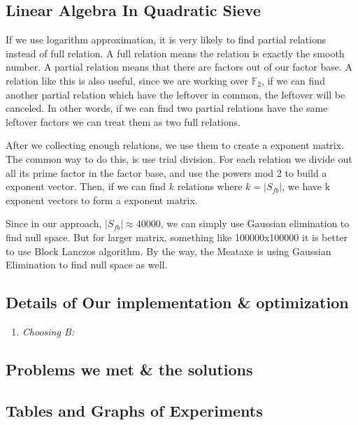 \documentclass[12pt]{article} %
\begin{document}
\subsection {Linear Algebra In Quadratic Sieve}

If we use logarithm approximation, it is very likely to find partial relations instead of full relation. A full relation means the relation is exactly the smooth number. A partial relation means that there are factors out of our factor base. A relation like this is also useful, since we are working over $\mathbb{F}_2$, if we can find another partial relation which have the leftover in common, the leftover will be canceled. In other words, if we can find two partial relations have the same leftover factors we can treat them as two full relations.

After we collecting enough relations, we use them to create a exponent matrix. The common way to do this, is use trial division. For each relation we divide out all its  prime factor in the factor base, and use the powers mod 2 to build a exponent vector. 
Then, if we can find $k$ relations where $k = |S_{fb}|$, we have k exponent vectors to form a exponent matrix. 

Since in our approach, $|S_{fb}|\approx 40000$, we can simply use Gaussian elimination to find null space. But for larger matrix, something like 100000x100000 it is better to use Block Lanczos algorithm. By the way, the Meataxe is using Gaussian Elimination to find null space as well.

\subsection {Details of Our implementation \& optimization}

\renewcommand\labelenumi{\Roman{enumi}}
\begin{enumerate}
\item \textit{Choosing B:} 
\end{enumerate}

\subsection {Problems we met \& the solutions}

\subsection {Tables and Graphs of Experiments}
\end{document}
